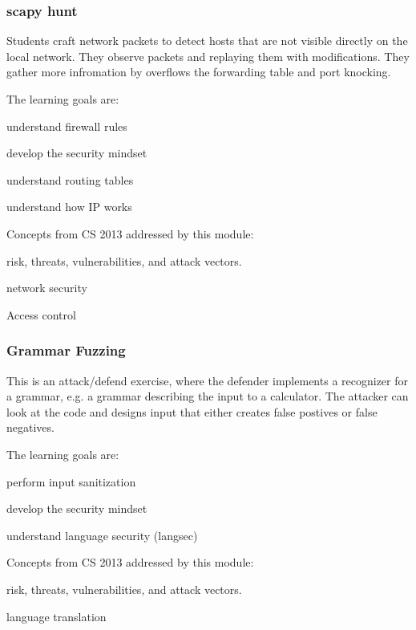 \subsubsection{scapy hunt}
Students craft network packets to detect hosts that are not visible directly on
the local network.  They observe packets and replaying them with modifications.  They gather
more infromation by overflows the forwarding table and port knocking.

The learning goals are:
\begin{packenum}
\item understand firewall rules
\item develop the security mindset
\item understand routing tables
\item understand how IP works
\end{packenum}
Concepts from CS 2013 addressed by this module:
\begin{packenum}
\item  risk, threats, vulnerabilities, and attack vectors.  
\item network security
\item Access control
\end{packenum}


\subsubsection{Grammar Fuzzing}
This is an attack/defend exercise, where the defender implements a recognizer for a grammar,
e.g. a grammar describing the input to a calculator.  The attacker can look at the code and
 designs input that either creates false postives or false negatives.

The learning goals are:
\begin{packenum}
\item perform input sanitization
\item develop the security mindset
\item understand language security (langsec)~\cite{bratus_SP_2014}
\end{packenum}
Concepts from CS 2013 addressed by this module:
\begin{packenum}
\item  risk, threats, vulnerabilities, and attack vectors.  
\item  language translation
\end{packenum}



